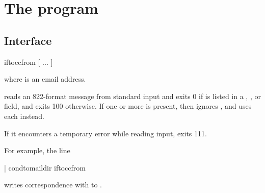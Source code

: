 
\chapter{The  program}

\section{Interface}
\begin{code}
  iftoccfrom [  ... ]
\end{code}
where  is an email address.

 reads an 822-format message from standard input and exits 0 if
 is listed in a , , or 
field, and exits 100 otherwise.  
If one or more  is present, then  ignores
, and uses each  instead.

If it encounters a temporary error while reading input,  exits
111.

For example, the  line
\begin{code}
  | condtomaildir  iftoccfrom 
\end{code}
writes correspondence with  to .

